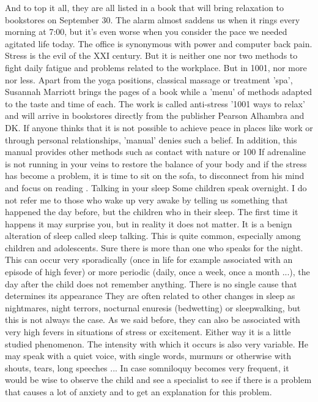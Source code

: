 And to top it all, they are all listed in a book that will bring relaxation to bookstores on September 30.
The alarm almost saddens us when it rings every morning at 7:00, but it's even worse when you consider the pace we needed agitated life today.
The office is synonymous with power and computer back pain.
Stress is the evil of the XXI century.
But it is neither one nor two methods to fight daily fatigue and problems related to the workplace.
But in 1001, nor more nor less.
Apart from the yoga positions, classical massage or treatment 'spa', Susannah Marriott brings the pages of a book while a 'menu' of methods adapted to the taste and time of each.
The work is called anti-stress '1001 ways to relax' and will arrive in bookstores directly from the publisher Pearson Alhambra and DK.
If anyone thinks that it is not possible to achieve peace in places like work or through personal relationships, 'manual' denies such a belief.
In addition, this manual provides other methods such as contact with nature or 100%
If adrenaline is not running in your veins to restore the balance of your body and if the stress has become a problem, it is time to sit on the sofa, to disconnect from his mind and focus on reading .
Talking in your sleep
Some children speak overnight.
I do not refer me to those who wake up very awake by telling us something that happened the day before, but the children who in their sleep.
The first time it happens it may surprise you, but in reality it does not matter.
It is a benign alteration of sleep called sleep talking.
This is quite common, especially among children and adolescents.
Sure there is more than one who speaks for the night.
This can occur very sporadically (once in life for example associated with an episode of high fever) or more periodic (daily, once a week, once a month ...), the day after the child does not remember anything.
There is no single cause that determines its appearance
They are often related to other changes in sleep as nightmares, night terrors, nocturnal enuresis (bedwetting) or sleepwalking, but this is not always the case.
As we said before, they can also be associated with very high fevers in situations of stress or excitement.
Either way it is a little studied phenomenon.
The intensity with which it occurs is also very variable.
He may speak with a quiet voice, with single words, murmurs or otherwise with shouts, tears, long speeches ...
In case somniloquy becomes very frequent, it would be wise to observe the child and see a specialist to see if there is a problem that causes a lot of anxiety and to get an explanation for this problem.
